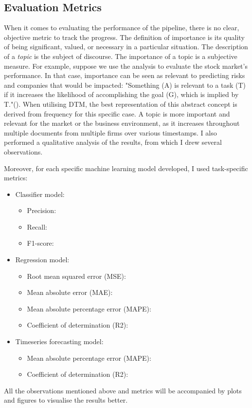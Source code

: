 \documentclass[12pt,MSc,a4paper,oneside]{muthesis}
\begin{document}
    \subsection{Evaluation Metrics}

    When it comes to evaluating the performance of the pipeline, there is no clear, objective metric to track the progress. The definition of importance is its quality of being significant, valued, or necessary in a particular situation. The description of a \textit{topic} is the subject of discourse. The importance of a topic is a subjective measure. For example, suppose we use the analysis to evaluate the stock market's performance. In that case, importance can be seen as relevant to predicting risks and companies that would be impacted: "Something (A) is relevant to a task (T) if it increases the likelihood of accomplishing the goal (G), which is implied by T."(\cite{Hjrland2002WorkTA}). When utilising DTM, the best representation of this abstract concept is derived from frequency for this specific case. A topic is more important and relevant for the market or the business environment, as it increases throughout multiple documents from multiple firms over various timestamps.
    I also performed a qualitative analysis of the results, from which I drew several observations.

    Moreover, for each specific machine learning model developed, I used task-specific metrics:
    \begin{itemize}
      \item Classifier model:
        \begin{itemize}
          \item Precision: \cite{wiki:p&r}
          \item Recall: \cite{wiki:p&r}
          \item F1-score: \cite{wiki:f-score}
        \end{itemize}
      \item Regression model:
        \begin{itemize}
          \item Root mean squared error (MSE): \cite{wiki:mse}
          \item Mean absolute error (MAE): \cite{wiki:mae}
          \item Mean absolute percentage error (MAPE): \cite{wiki:mape}
          \item Coefficient of determination (R2): \cite{wiki:r2}
        \end{itemize}
      \item Timeseries forecasting model:
        \begin{itemize}
          \item Mean absolute percentage error (MAPE): \cite{wiki:mape}
          \item Coefficient of determination (R2): \cite{wiki:r2}
        \end{itemize}
    \end{itemize}
    All the observations mentioned above and metrics will be accompanied by plots and figures to visualise the results better.
\end{document}
